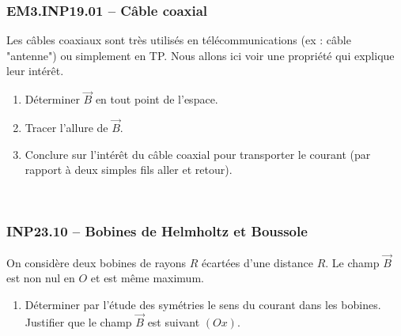 \subsubsection*{EM3.INP19.01 -- Câble coaxial  \lesdeux}

Les câbles coaxiaux sont très utilisés en télécommunications (ex : câble "antenne") ou simplement en TP. Nous allons ici voir une propriété qui explique leur intérêt.

\begin{minipage}[t]{0.7\textwidth} %

\begin{enumerate}
    \item Déterminer $\overrightarrow{B}$ en tout point de l'espace.
    \item Tracer l'allure de $\overrightarrow{B}$.
    \item Conclure sur l'intérêt du câble coaxial pour transporter le courant (par rapport à deux simples fils aller et retour).
\end{enumerate}
\end{minipage}
\hfill %
\begin{minipage}[t]{0.3\textwidth} %
~
\vspace{0em}




\end{minipage}


\newpage
\subsubsection*{INP23.10 -- Bobines de Helmholtz et Boussole  }

On considère deux bobines de rayons $R$ écartées d'une distance $R$. Le champ $\overrightarrow{B}$ est non nul en $O$ et est même maximum.

\begin{center}
\end{center}

\begin{enumerate}
    \item Déterminer par l'étude des symétries le sens du courant dans les bobines. Justifier que le champ $\overrightarrow{B}$ est suivant $(Ox)$.
\end{enumerate}

